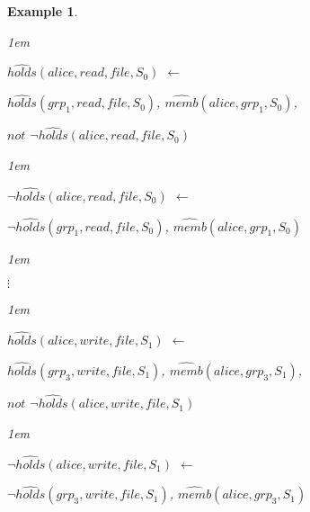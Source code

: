 \documentclass[11pt]{report}
\newtheorem{vexample}{Example}[chapter]
\newenvironment{vquote}
{
  \begin{list}{}{\leftmargin 1em}\item[]
}
{
  \end{list}
}
\begin{document}
\begin{vexample}
\begin{enumerate}
              \begin{vquote}
                $\hat{holds}(alice, read, file, S_{0})$ $\leftarrow$

                \hspace{1em}
                $\hat{holds}(grp_1, read, file, S_{0})$,
                $\hat{memb}(alice, grp_1, S_{0})$,

                \hspace{1em}
                $not$ $\lnot\hat{holds}(alice, read, file, S_{0})$
              \end{vquote}

              \begin{vquote}
                $\lnot\hat{holds}(alice, read, file, S_{0})$ $\leftarrow$

                \hspace{1em}
                $\lnot\hat{holds}(grp_1, read, file, S_{0})$,
                $\hat{memb}(alice, grp_1, S_{0})$
              \end{vquote}

              \begin{vquote}
                \hspace{2em}$\vdots$
              \end{vquote}

              \begin{vquote}
                $\hat{holds}(alice, write, file, S_{1})$ $\leftarrow$

                \hspace{1em}
                $\hat{holds}(grp_3, write, file, S_{1})$,
                $\hat{memb}(alice, grp_3, S_{1})$,

                \hspace{1em}
                $not$ $\lnot\hat{holds}(alice, write, file, S_{1})$
              \end{vquote}

              \begin{vquote}
                $\lnot\hat{holds}(alice, write, file, S_{1})$ $\leftarrow$

                \hspace{1em}
                $\lnot\hat{holds}(grp_3, write, file, S_{1})$,
                $\hat{memb}(alice, grp_3, S_{1})$
              \end{vquote}


\end{enumerate}
\end{vexample}
\end{document}
